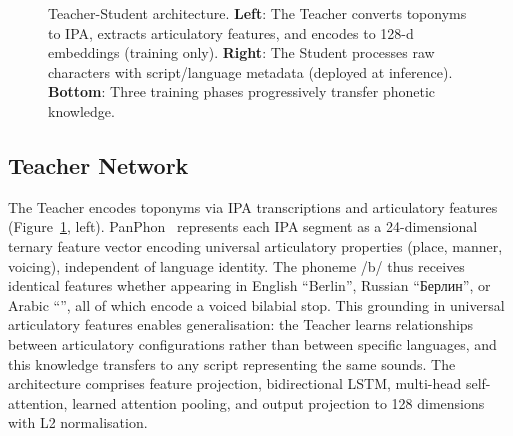 \documentclass[11pt,a4paper]{article}
\newcommand{\textar}[1]{{\arabicfont\RL{#1}}}
\newcommand{\embdim}{128}
\begin{document}
\begin{figure}[ht]
\caption{Teacher-Student architecture. \textbf{Left}: The Teacher converts toponyms to IPA, extracts articulatory features, and encodes to 128-d embeddings (training only). \textbf{Right}: The Student processes raw characters with script/language metadata (deployed at inference). \textbf{Bottom}: Three training phases progressively transfer phonetic knowledge.}
\label{fig:architecture}
\end{figure}

\subsection{Teacher Network}
\label{subsec:teacher}

The Teacher encodes toponyms via IPA transcriptions and articulatory features (Figure~\ref{fig:architecture}, left). PanPhon~\citep{mortensen2016} represents each IPA segment as a 24-dimensional ternary feature vector encoding universal articulatory properties (place, manner, voicing), independent of language identity. The phoneme /b/ thus receives identical features whether appearing in English ``Berlin'', Russian ``Берлин'', or Arabic ``\textar{برلين}'', all of which encode a voiced bilabial stop. This grounding in universal articulatory features enables generalisation: the Teacher learns relationships between articulatory configurations rather than between specific languages, and this knowledge transfers to any script representing the same sounds. The architecture comprises feature projection, bidirectional LSTM, multi-head self-attention, learned attention pooling, and output projection to \embdim{} dimensions with L2 normalisation.
\end{document}
